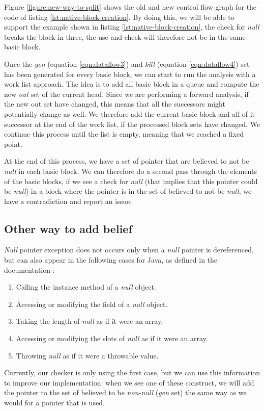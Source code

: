 Figure \ref{figure:new-way-to-split} shows the old and new control flow graph for the code of listing \ref{lst:native-block-creation}. 
By doing this, we will be able to support the example shown in listing \ref{lst:native-block-creation}, the check for \emph{null} breaks the block in three, the use and check will therefore not be in the same basic block.

Once the \emph{gen} (equation \ref{eqn:dataflow3}) and \emph{kill} (equation \ref{eqn:dataflow4}) set has been generated for every basic block, we can start to run the analysis with a work list approach.
The idea is to add all basic block in a queue and compute the new \emph{out} set of the current head. 
Since we are performing a forward analysis, if the new out set have changed, this means that all the successors might potentially change as well. 
We therefore add the current basic block and all of it successor at the end of the work list, if the processed block sets have changed. 
We continue this process until the list is empty, meaning that we reached a fixed point.

At the end of this process, we have a set of pointer that are believed to not be \emph{null} in each basic block.
We can therefore do a second pass through the elements of the basic blocks, if we see a check for \emph{null} (that implies that this pointer could be \emph{null}) in a block where the pointer is in the set of believed to not be \emph{null}, we have a contradiction and report an issue.

\subsection{Other way to add belief}
\label{subsec:other_way_to_add_belief}

\emph{Null} pointer exception does not occurs only when a \emph{null} pointer is dereferenced, but can also appear in the following cases for Java, as defined in the documentation \cite{OracleDoc:2019:Online}:

\begin{enumerate}
	\item Calling the instance method of a \emph{null} object. \newline 
	\item Accessing or modifying the field of a \emph{null} object. \newline 
	\item Taking the length of \emph{null} as if it were an array. \newline 
	\item Accessing or modifying the slots of \emph{null} as if it were an array. \newline 
	\item Throwing \emph{null} as if it were a throwable value. \newline 
\end{enumerate}
Currently, our checker is only using the first case, but we can use this information to improve our implementation: when we see one of these construct, we will add the pointer to the set of believed to be \emph{non-null} (\emph{gen} set) the same way as we would for a pointer that is used.


